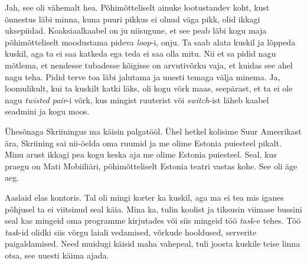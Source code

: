 
Jah, see oli vähemalt hea. Põhimõtteliselt ainuke lootustandev koht, kust õnnestus läbi minna, kuna puuri pikkus ei olnud väga pikk, olid ikkagi uksepiidad. Koaksiaalkaabel on ju niisugune, et see peab läbi kogu maja põhimõtteliselt moodustama pideva \emph{loop}-i, onju. Ta saab alata kuskil ja lõppeda kuskil, aga ta ei saa katkeda ega teda ei saa olla mitu. Nii et sa pidid nagu mõtlema, et nendesse tubadesse kõigisse on arvutivõrku vaja, et kuidas see ahel nagu teha. Pidid terve toa läbi jalutama ja uuesti temaga välja minema. Ja, loomulikult, kui ta kuskilt katki läks, oli kogu võrk maas, seepärast, et ta ei ole nagu \emph{twisted pair}-i võrk, kus mingist ruuterist või \emph{switch}-ist läheb kaabel seadmini ja kogu moos. 

Ühesõnaga Skriiningus ma käisin palgatööl. Ühel hetkel kolisime Suur Ameerikast ära, Skriining sai nii-öelda oma ruumid ja me olime Estonia puiesteel pikalt. Minu arust ikkagi pea kogu keska aja me olime Estonia puiesteel. Seal, kus praegu on Mati Mobiiliäri, põhimõtteliselt Estonia teatri vastas kohe. See oli äge aeg. 

Aaslaid elas kontoris. Tal oli mingi korter ka kuskil, aga ma ei tea mis iganes põhjusel ta ei viitsinud seal käia. Mina ka, tulin koolist ja tiksusin viimase bussini seal kas  mingeid oma programme kirjutades või siis mingeid töö \emph{task}-e tehes. Töö \emph{task}-id olidki siis võrgu laiali vedamised,  võrkude hooldused, serverite paigaldamised. Need muidugi käisid maha vahepeal, tuli joosta kuskile teise linna otsa, see uuesti käima ajada. 

